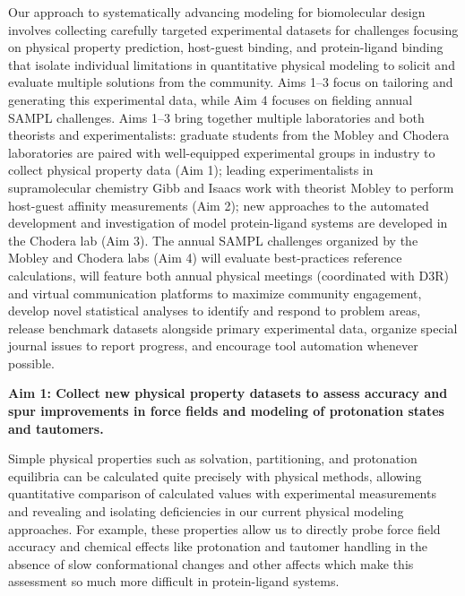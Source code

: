 \documentclass[11pt]{article}
\begin{document}
Our approach to systematically advancing modeling for biomolecular design involves collecting carefully targeted experimental datasets for challenges focusing on physical property prediction, host-guest binding, and protein-ligand binding that isolate individual limitations in quantitative physical modeling to solicit and evaluate multiple solutions from the community.
Aims 1--3 focus on tailoring and generating this experimental data, while Aim 4 focuses on fielding annual SAMPL challenges.
Aims 1--3 bring together multiple laboratories and both theorists and experimentalists: graduate students from the Mobley and Chodera laboratories are paired with well-equipped experimental groups in industry to collect physical property data (Aim 1); leading experimentalists in supramolecular chemistry Gibb and Isaacs work with theorist Mobley to perform host-guest affinity measurements (Aim 2); new approaches to the automated development and investigation of model protein-ligand systems are developed in the Chodera lab (Aim 3).
The annual SAMPL challenges organized by the Mobley and Chodera labs (Aim 4) will evaluate best-practices reference calculations, will feature both annual physical meetings (coordinated with D3R) and virtual communication platforms to maximize community engagement, develop novel statistical analyses to identify and respond to problem areas, release benchmark datasets alongside primary experimental data, organize special journal issues to report progress, and encourage tool automation whenever possible.

{\bf Aim 1: Collect new physical property datasets to assess accuracy and spur improvements in force fields and modeling of protonation states and tautomers.} 

Simple physical properties such as solvation, partitioning, and protonation equilibria can be calculated quite precisely with physical methods, allowing quantitative comparison of calculated values with experimental measurements and revealing and isolating deficiencies in our current physical modeling approaches. 
For example, these properties allow us to directly probe force field accuracy and chemical effects like protonation and tautomer handling in the absence of slow conformational changes and other affects which make this assessment so much more difficult in protein-ligand systems. 
\end{document}

